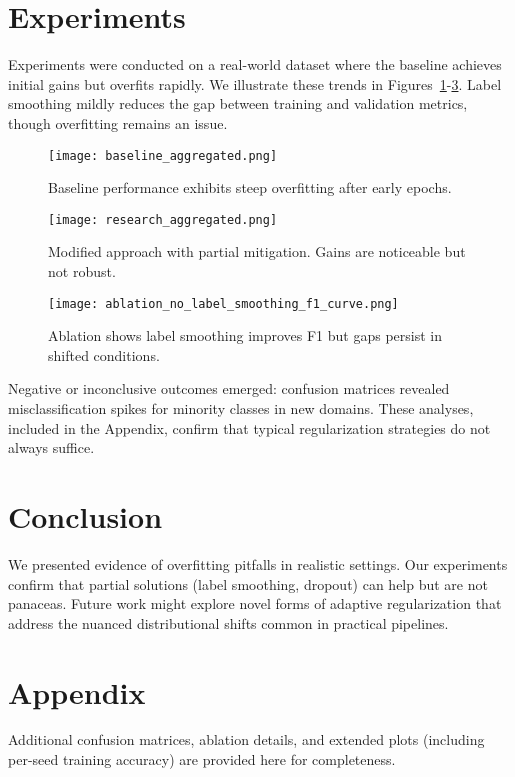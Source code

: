 \documentclass{article}
\begin{document}
\section{Experiments}
Experiments were conducted on a real-world dataset where the baseline achieves initial gains but overfits rapidly. We illustrate these trends in Figures~\ref{fig:baseline}-\ref{fig:ablation}. Label smoothing mildly reduces the gap between training and validation metrics, though overfitting remains an issue.

\begin{figure}[t]
\centering
\texttt{[image: baseline\_aggregated.png]}
\caption{Baseline performance exhibits steep overfitting after early epochs.}
\label{fig:baseline}
\end{figure}

\begin{figure}[t]
\centering
\texttt{[image: research\_aggregated.png]}
\caption{Modified approach with partial mitigation. Gains are noticeable but not robust.}
\label{fig:research}
\end{figure}

\begin{figure}[t]
\centering
\texttt{[image: ablation\_no\_label\_smoothing\_f1\_curve.png]}
\caption{Ablation shows label smoothing improves F1 but gaps persist in shifted conditions.}
\label{fig:ablation}
\end{figure}

Negative or inconclusive outcomes emerged: confusion matrices revealed misclassification spikes for minority classes in new domains. These analyses, included in the Appendix, confirm that typical regularization strategies do not always suffice.

\section{Conclusion}
We presented evidence of overfitting pitfalls in realistic settings. Our experiments confirm that partial solutions (label smoothing, dropout) can help but are not panaceas. Future work might explore novel forms of adaptive regularization that address the nuanced distributional shifts common in practical pipelines.

\clearpage



\appendix
\section{Appendix}
Additional confusion matrices, ablation details, and extended plots (including per-seed training accuracy) are provided here for completeness.
\end{document}
